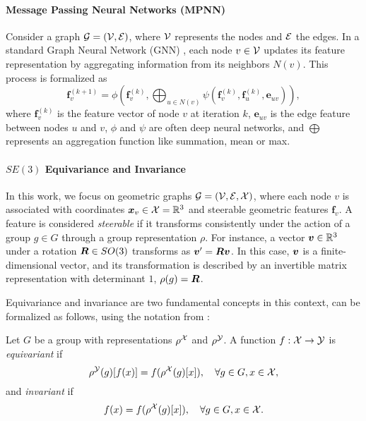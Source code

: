 \paragraph{Message Passing Neural Networks (MPNN)}

Consider a graph ${\mathcal{G}}=({\mathcal{V}},{\mathcal{E}})$, where ${\mathcal{V}}$ represents the nodes and ${\mathcal{E}}$ the edges. In a standard Graph Neural Network (GNN) \citep{battaglia2018relational}, each node $v \in {\mathcal{V}}$ updates its feature representation by aggregating information from its neighbors $N(v)$. This process is formalized as
\begin{equation} \label{eq:mpnn}
    \mathbf{f}_v^{(k+1)} = \phi \left( \mathbf{f}_v^{(k)}, \bigoplus_{u \in N(v)} \psi \left( \mathbf{f}_v^{(k)}, \mathbf{f}_u^{(k)}, \mathbf{e}_{uv} \right) \right),
\end{equation}
where $\mathbf{f}_v^{(k)}$ is the feature vector of node $v$ at iteration $k$, $\mathbf{e}_{uv}$ is the edge feature between nodes $u$ and $v$, $\phi$ and $\psi$ are often deep neural networks, and $\bigoplus$ represents an aggregation function like summation, mean or max.

\paragraph{$SE(3)$ Equivariance and Invariance}

In this work, we focus on geometric graphs ${\mathcal{G}} = ({\mathcal{V}}, {\mathcal{E}}, {\mathcal{X}})$, where each node $v$ is associated with coordinates ${\bm{x}}_v \in {\mathcal{X}} = \mathbb{R}^3$ and steerable geometric features $\mathbf{f}_v$. A feature is considered \emph{steerable} if it transforms consistently under the action of a group $g \in G$ through a group representation $\rho$. For instance, a vector ${\bm{v}} \in \mathbb{R}^3$ under a rotation ${\bm{R}} \in SO(3)$ transforms as ${\bm{v}}' = {\bm{R}} {\bm{v}}$. In this case, ${\bm{v}}$ is a finite-dimensional vector, and its transformation is described by an invertible matrix representation with determinant $1$, $\rho(g) = {\bm{R}}$.

Equivariance and invariance are two fundamental concepts in this context, can be formalized as follows, using the notation from \citet{brandstetter2022geometric}:
\begin{definition}
    \label{def:eq_and_inv}
    Let $G$ be a group with representations $\rho^{{\mathcal{X}}}$ and $\rho^{{\mathcal{Y}}}$. A function $f: {\mathcal{X}} \to {\mathcal{Y}}$ is \textit{equivariant} if
    \begin{equation*}
        \rho^{{\mathcal{Y}}}(g)[f(x)] = f(\rho^{{\mathcal{X}}}(g)[x]), \quad \forall g \in G, x \in {\mathcal{X}},
    \end{equation*}
    and \textit{invariant} if
    \begin{equation*}
        f(x) = f(\rho^{{\mathcal{X}}}(g)[x]), \quad \forall g \in G, x \in {\mathcal{X}}.
    \end{equation*}
\end{definition}

